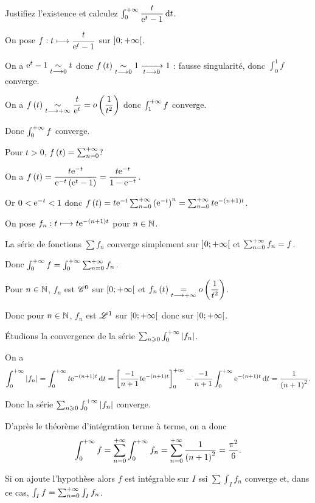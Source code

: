 \begin{exo}
Justifiez l'existence et calculez \(\int_0^{\pinf}\dfrac{t}{\e{t}-1}\odif{t}\).
\end{exo}

\begin{corr}
On pose \(f:t\longmapsto\dfrac{t}{\mathrm{e}^{t}-1}\) sur \(\left]0;+\infty\right[\).

On a \(\mathrm{e}^{t}-1\underset{t\longrightarrow0}{\sim}t\) donc \(f\left(t\right)\underset{t\longrightarrow0}{\sim}1\xrightarrow[t\longrightarrow0]{}1\) : fausse singularité, donc \(\int_0^1f\) converge.

On a \(f\left(t\right)\underset{t\longrightarrow+\infty}{\sim}\dfrac{t}{\mathrm{e}^{t}}=o\left(\dfrac{1}{t^2}\right)\) donc \(\int_1^{+\infty}f\) converge.

Donc \(\int_0^{+\infty}f\) converge.

Pour \(t>0\), \(f\left(t\right)=\sum_{n=0}^{+\infty}?\)

On a \(f\left(t\right)=\dfrac{t\mathrm{e}^{-t}}{\mathrm{e}^{-t}\left(\mathrm{e}^{t}-1\right)}=\dfrac{t\mathrm{e}^{-t}}{1-\mathrm{e}^{-t}}\).

Or \(0<\mathrm{e}^{-t}<1\) donc \(f\left(t\right)=t\mathrm{e}^{-t}\sum_{n=0}^{+\infty}\left(\mathrm{e}^{-t}\right)^n=\sum_{n=0}^{+\infty}t\mathrm{e}^{-\left(n+1\right)t}\).

On pose \(f_n:t\longmapsto t\mathrm{e}^{-\left(n+1\right)t}\) pour \(n\in\mathbb{N}\).

La série de fonctions \(\sum f_n\) converge simplement sur \(\left]0;+\infty\right[\) et \(\sum_{n=0}^{+\infty}f_n=f\).

Donc \(\int_0^{+\infty}f=\int_0^{+\infty}\sum_{n=0}^{+\infty}f_n\).

Pour \(n\in\mathbb{N}\), \(f_n\) est \(\mathscr{C}^{0}\) sur \(\left[0;+\infty\right[\) et \(f_n\left(t\right)\underset{t\longrightarrow+\infty}{=}o\left(\dfrac{1}{t^2}\right)\).

Donc pour \(n\in\mathbb{N}\), \(f_n\) est \(\integ{1}{}{}\) sur \(\left[0;+\infty\right[\) donc sur \(\left]0;+\infty\right[\).

Étudions la convergence de la série \(\sum_{n\geqslant0}\int_0^{+\infty}\left\lvert f_n\right\rvert\).

On a \[\int_0^{\pinf}\abs{f_n}=\int_0^{\pinf}t\e{-\paren{n+1}t}\odif{t}=\croch{\dfrac{-1}{n+1}t\e{-\paren{n+1}t}}_0^{\pinf}-\dfrac{-1}{n+1}\int_0^{\pinf}\e{-\paren{n+1}t}\odif{t}=\dfrac{1}{\paren{n+1}^2}.\]

Donc la série \(\sum_{n\geqslant0}\int_0^{+\infty}\left\lvert f_n\right\rvert\) converge.

D'après le théorème d'intégration terme à terme, on a donc \[\int_0^{+\infty}f=\sum_{n=0}^{+\infty}\int_0^{+\infty}f_n=\sum_{n=0}^{+\infty}\dfrac{1}{\left(n+1\right)^2}=\dfrac{\pi^2}{6}.\]
\end{corr}

\begin{rem}
Si on ajoute l'hypothèse  alors \(f\) est intégrable sur \(I\) ssi \(\sum\int_If_n\) converge et, dans ce cas, \(\int_If=\sum_{n=0}^{+\infty}\int_If_n\).
\end{rem}

